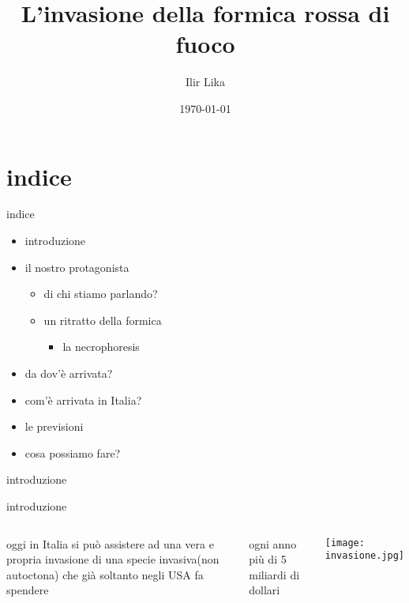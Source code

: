 \documentclass{beamer}
\title{L'invasione della formica rossa di fuoco}
\author{Ilir Lika}
\institute{Istituto Maria Immacolata}
\date{\today}
\begin{document}
\frame{\titlepage}
	\section{indice}
\begin{frame}{indice}
	\begin{itemize}[label=$\bullet$]
		\item introduzione
		\item il nostro protagonista
   \begin{itemize}[label=]
	\item di chi stiamo parlando?
   \item un ritratto della formica
   \begin{itemize}[label=$\blacksquare$]
       \item la necrophoresis
   \end{itemize}
   \end{itemize}
		\item da dov'è arrivata?
        \item com'è arrivata in Italia?
        \item le previsioni
        \item cosa possiamo fare?
    \end{itemize}
	\end{frame}
\begin{section}{introduzione}
\begin{frame}{introduzione}
    \begin{columns}
        \centering
        oggi in Italia si può assistere ad \alert{una vera e propria invasione} di una specie invasiva(non autoctona) che già soltanto negli USA fa spendere
        \begin{alertblock}{ogni anno}
        più di 5 miliardi di dollari 
        \end{alertblock}
        \centering
        \texttt{[image: invasione.jpg]}
    \end{columns}
    
\end{frame}
\end{section}
\end{document}
